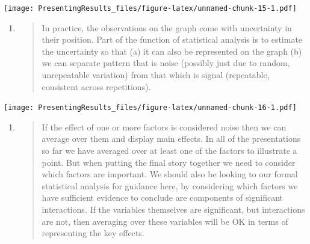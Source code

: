 \documentclass[
]{book}
\begin{document}
\texttt{[image: PresentingResults\_files/figure-latex/unnamed-chunk-15-1.pdf]}

\begin{enumerate}
\def\labelenumi{\arabic{enumi}.}
\setcounter{enumi}{6}
\item
  \begin{quote}
  In practice, the observations on the graph come with uncertainty in their position. Part of the function of statistical analysis is to estimate the uncertainty so that (a) it can also be represented on the graph (b) we can separate pattern that is noise (possibly just due to random, unrepeatable variation) from that which is signal (repeatable, consistent across repetitions).
  \end{quote}
\end{enumerate}

\texttt{[image: PresentingResults\_files/figure-latex/unnamed-chunk-16-1.pdf]}

\begin{enumerate}
\def\labelenumi{\arabic{enumi}.}
\setcounter{enumi}{7}
\item
  \begin{quote}
  If the effect of one or more factors is considered noise then we can average over them and display main effects. In all of the presentations so far we have averaged over at least one of the factors to illustrate a point. But when putting the final story together we need to consider which factors are important. We should also be looking to our formal statistical analysis for guidance here, by considering which factors we have sufficient evidence to conclude are components of significant interactions. If the variables themselves are significant, but interactions are not, then averaging over these variables will be OK in terms of representing the key effects.
  \end{quote}
\end{enumerate}
\end{document}
